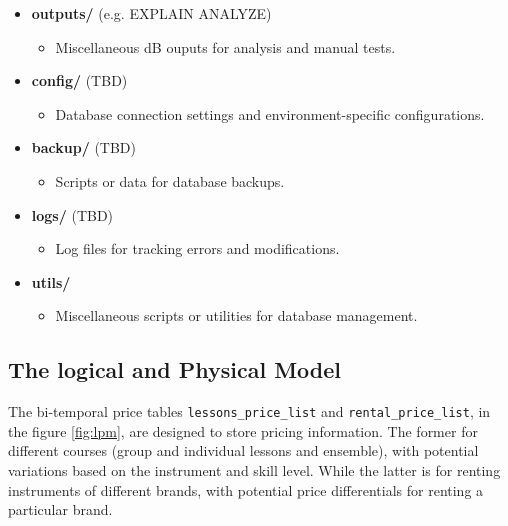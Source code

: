 \documentclass[a4paper]{scrartcl}
\begin{document}
\begin{itemize}
\item \textbf{outputs/} (e.g. EXPLAIN ANALYZE)
\begin{itemize}
  \item Miscellaneous dB ouputs for analysis and manual tests.
\end{itemize}

\item \textbf{config/} (TBD)
\begin{itemize}
  \item Database connection settings and environment-specific configurations.
\end{itemize}

\item \textbf{backup/} (TBD)
\begin{itemize}
  \item Scripts or data for database backups.
\end{itemize}

\item \textbf{logs/} (TBD)
\begin{itemize}
  \item Log files for tracking errors and modifications.
\end{itemize}

\item \textbf{utils/}
\begin{itemize}
  \item Miscellaneous scripts or utilities for database management.
\end{itemize}
\end{itemize}


\subsection*{The logical and Physical Model}
The bi-temporal price tables \verb|lessons_price_list| and \verb|rental_price_list|, in the figure \ref{fig:lpm},
are designed to store pricing information.
The former for different courses (group and individual lessons and ensemble),
with potential variations based on the instrument and skill level.
While the latter is for renting instruments of different brands, with potential price differentials for
renting a particular brand.
\end{document}
